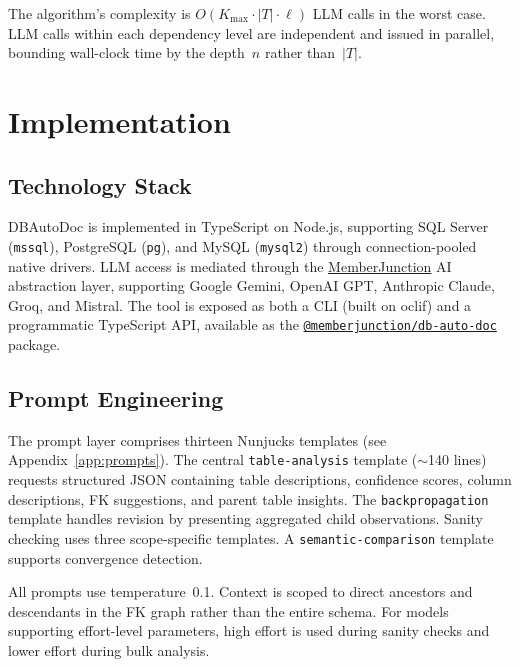 \documentclass[twocolumn]{svjour3}
\begin{document}
The algorithm's complexity is $O(K_{\max} \cdot |T| \cdot \ell)$ LLM calls in the worst case. LLM calls within each dependency level are independent and issued in parallel, bounding wall-clock time by the depth~$n$ rather than~$|T|$.


\section{Implementation}\label{sec:implementation}

\subsection{Technology Stack}

DBAutoDoc is implemented in TypeScript on Node.js, supporting SQL Server (\texttt{mssql}), PostgreSQL (\texttt{pg}), and MySQL (\texttt{mysql2}) through connection-pooled native drivers. LLM access is mediated through the \href{https://github.com/MemberJunction/MJ}{MemberJunction} AI abstraction layer, supporting Google Gemini, OpenAI GPT, Anthropic Claude, Groq, and Mistral. The tool is exposed as both a CLI (built on oclif) and a programmatic TypeScript API, available as the \href{https://github.com/MemberJunction/MJ/tree/next/packages/DBAutoDoc}{\texttt{@memberjunction/db-auto-doc}} package.

\subsection{Prompt Engineering}

The prompt layer comprises thirteen Nunjucks templates (see Appendix~\ref{app:prompts}). The central \texttt{table-analysis} template ($\sim$140 lines) requests structured JSON containing table descriptions, confidence scores, column descriptions, FK suggestions, and parent table insights. The \texttt{backpropagation} template handles revision by presenting aggregated child observations. Sanity checking uses three scope-specific templates. A \texttt{semantic-comparison} template supports convergence detection.

All prompts use temperature~0.1. Context is scoped to direct ancestors and descendants in the FK graph rather than the entire schema. For models supporting effort-level parameters, high effort is used during sanity checks and lower effort during bulk analysis.
\end{document}
